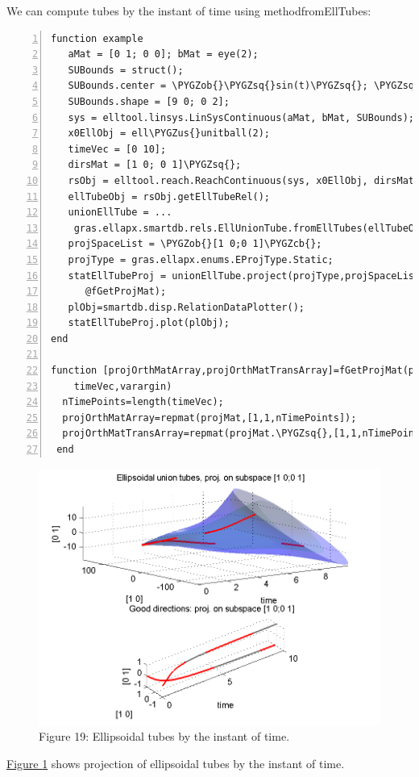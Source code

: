 \documentclass[letterpaper,10pt,english]{sphinxmanual}
\def\PYGZus{\char`\_}
\def\PYGZob{\char`\{}
\def\PYGZcb{\char`\}}
\def\PYGZsq{\char`\'}
\begin{document}
We can compute tubes by the instant of time using methodfromEllTubes:

\begin{Verbatim}[commandchars=\\\{\},numbers=left,firstnumber=1,stepnumber=1]
function example
   aMat = [0 1; 0 0]; bMat = eye(2);  
   SUBounds = struct();
   SUBounds.center = \PYGZob{}\PYGZsq{}sin(t)\PYGZsq{}; \PYGZsq{}cos(t)\PYGZsq{}\PYGZcb{};  
   SUBounds.shape = [9 0; 0 2]; 
   sys = elltool.linsys.LinSysContinuous(aMat, bMat, SUBounds);
   x0EllObj = ell\PYGZus{}unitball(2);
   timeVec = [0 10]; 
   dirsMat = [1 0; 0 1]\PYGZsq{};  
   rsObj = elltool.reach.ReachContinuous(sys, x0EllObj, dirsMat, timeVec);
   ellTubeObj = rsObj.getEllTubeRel();
   unionEllTube = ...
    gras.ellapx.smartdb.rels.EllUnionTube.fromEllTubes(ellTubeObj);
   projSpaceList = \PYGZob{}[1 0;0 1]\PYGZcb{};
   projType = gras.ellapx.enums.EProjType.Static;
   statEllTubeProj = unionEllTube.project(projType,projSpaceList,...
      @fGetProjMat);
   plObj=smartdb.disp.RelationDataPlotter();
   statEllTubeProj.plot(plObj);
end

function [projOrthMatArray,projOrthMatTransArray]=fGetProjMat(projMat,...
    timeVec,varargin)
  nTimePoints=length(timeVec);
  projOrthMatArray=repmat(projMat,[1,1,nTimePoints]);
  projOrthMatTransArray=repmat(projMat.\PYGZsq{},[1,1,nTimePoints]);
 end
\end{Verbatim}
\begin{figure}[htbp]
\centering
\capstart

\includegraphics[width=0.700\linewidth]{chapter05_section03_unionTubeStatProj.png}
\caption{Figure 19: Ellipsoidal tubes by the instant of time.}\label{chap_implement:uniontubestatproj}\end{figure}

\hyperref[chap_implement:uniontubestatproj]{Figure  \ref*{chap_implement:uniontubestatproj}} shows projection of ellipsoidal
tubes by the instant of time.
\end{document}

